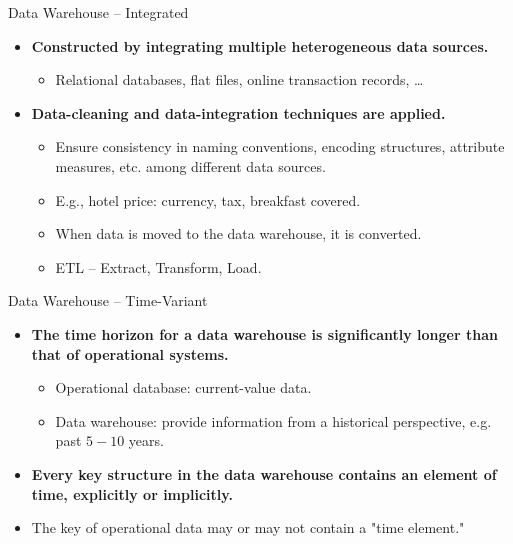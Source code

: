\begin{frame}{Data Warehouse -- Integrated}
	\begin{itemize}
		\item \textbf{Constructed by {\color{airforceblue}integrating multiple heterogeneous data sources}.}
		      \begin{itemize}
			      \item Relational databases, flat files, online transaction records, \ldots
		      \end{itemize}
		\item \textbf{Data-cleaning and data-integration techniques are applied.}
		      \begin{itemize}
			      \item Ensure consistency in naming conventions, encoding structures, attribute measures, etc. among different data sources.
			      \item E.g., hotel price: currency, tax, breakfast covered.
			      \item When data is moved to the data warehouse, it is converted.
			      \item ETL -- Extract, Transform, Load.
		      \end{itemize}
	\end{itemize}
\end{frame}

\begin{frame}{Data Warehouse -- Time-Variant}
	\begin{itemize}
		\item \textbf{The {\color{airforceblue}time horizon} for a data warehouse is
				      {\color{airforceblue}significantly longer} than that of operational
			      systems.}
		      \begin{itemize}
			      \item Operational database: current-value data.
			      \item Data warehouse: provide information from a historical perspective, e.g. past $5-10$ years.
		      \end{itemize}
		\item \textbf{Every key structure in the data warehouse contains an
			      element of time, explicitly or implicitly.}
		\item The key of operational data may or may not contain a "time element."
	\end{itemize}
\end{frame}

